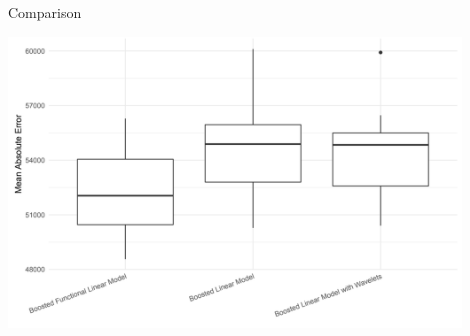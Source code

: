 \begin{vbframe}{Comparison}
    
    \begin{center}
        \includegraphics[width=0.9\textwidth]{figure_man/comparison.png}
    \end{center}
    
\end{vbframe}


\endlecture

